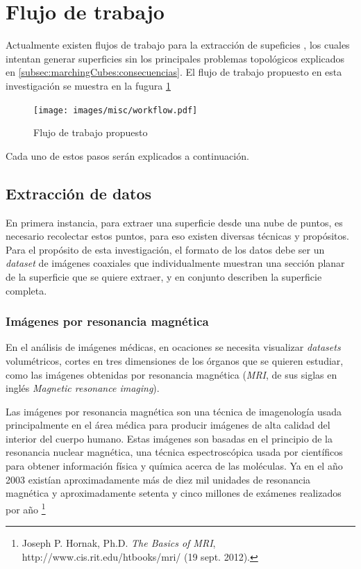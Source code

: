 \section{Flujo de trabajo}
\label{ch:propuesta:sec:flujoDeTrabajo}

Actualmente existen flujos de trabajo para la extracción de supeficies \cite{Ruprecht94ascheme}\cite{Dietrich_marchingcubes}, los cuales intentan generar superficies sin los principales problemas topológicos explicados en \ref{subsec:marchingCubes:consecuencias}. El flujo de trabajo propuesto en esta investigación se muestra en la fugura \ref{f:flujoDeTrabajo:flujoDeTrabajo}

\begin{figure}[htb]
\centering
	\texttt{[image: images/misc/workflow.pdf]}
\caption{Flujo de trabajo propuesto}
\label{f:flujoDeTrabajo:flujoDeTrabajo}
\end{figure}

Cada uno de estos pasos serán explicados a continuación.
\newpage

\subsection{Extracción de datos}
\label{ch:propuesta:sec:extraccionDeDatos}

En primera instancia, para extraer una superficie desde una nube de puntos, es necesario recolectar estos puntos, para eso existen diversas técnicas y propósitos. Para el propósito de esta investigación, el formato de los datos debe ser un \emph{dataset} de imágenes coaxiales que individualmente muestran una sección planar de la superficie que se quiere extraer, y en conjunto describen la superficie completa.

\subsubsection{Imágenes por resonancia magnética}
\label{ch:propuesta:sec:extraccionDeDatos:subsec:imagenesPorResonanciaMagnetica}

En el análisis de imágenes médicas, en ocaciones se necesita visualizar \emph{datasets} volumétricos, cortes en tres dimensiones de los órganos que se quieren estudiar, como las imágenes obtenidas por resonancia magnética (\emph{MRI}, de sus siglas en inglés \emph{Magnetic resonance imaging}).

Las imágenes por resonancia magnética son una técnica de imagenología usada principalmente en el área médica para producir imágenes de alta calidad del interior del cuerpo humano. Estas imágenes son basadas en el principio de la resonancia nuclear magnética, una técnica espectroscópica usada por científicos para obtener información física y química acerca de las moléculas. Ya en el año 2003 existían aproximadamente más de diez mil unidades de resonancia magnética y aproximadamente setenta y cinco millones de exámenes realizados por año \footnote{Joseph P. Hornak, Ph.D. \textit{The Basics of MRI}, http://www.cis.rit.edu/htbooks/mri/ (19 sept. 2012).}

